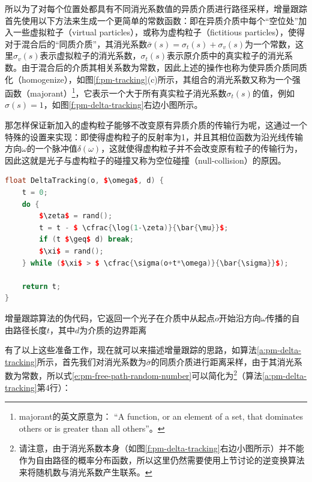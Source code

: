 所以为了对每个位置处都具有不同消光系数值的异质介质进行路径采样，增量跟踪首先使用以下方法来生成一个更简单的常数函数：即在异质介质中每个“空位处”加入一些虚拟粒子（virtual particles），或称为虚构粒子（fictitious particles），使得对于混合后的“同质介质”，其消光系数$\bar{\sigma}(s)=\sigma_t(s)+\sigma_v(s)$为一个常数，这里$\sigma_v(s)$表示虚拟粒子的消光系数，$\sigma_t(s)$表示原介质中的真实粒子的消光系数。由于混合后的介质其相关系数为常数，因此上述的操作也称为使异质介质同质化（homogenize），如图\ref{f:pm-tracking}(c)所示，其组合的消光系数又称为一个强函数（majorant）\footnote{majorant的英文原意为： “A function, or an element of a set, that dominates others or is greater than all others”。}，它表示一个大于所有真实粒子消光系数$\sigma_t(s)$的值，例如$\sigma(s)=1$\cite{a:ProgressivePhotonBeams}，如图\ref{f:pm-delta-tracking}右边小图所示。

那怎样保证新加入的虚构粒子能够不改变原有异质介质的传输行为呢，这通过一个特殊的设置来实现：即使得虚构粒子的反射率为1，并且其相位函数为沿光线传输方向$\omega$的一个脉冲值$\delta(\omega)$，这就使得虚构粒子并不会改变原有粒子的传输行为，因此这就是光子与虚构粒子的碰撞又称为空位碰撞（null-collision）的原因。

\begin{algorithm}
\begin{lstlisting}[language=C++, mathescape]
float DeltaTracking(o, $\omega$, d) {
	t = 0;
	do {
		$\zeta$ = rand();
		t = t - $ \cfrac{\log(1-\zeta)}{\bar{\mu}}$;
		if (t $\geq$ d) break;
		$\xi$ = rand();
	} while ($\xi$ > $ \cfrac{\sigma(o+t*\omega)}{\bar{\sigma}}$);
	
	return t;
}
\end{lstlisting}
\caption{增量跟踪算法的伪代码，它返回一个光子在介质中从起点$o$开始沿方向$\omega$传播的自由路径长度$t$，其中$d$为介质的边界距离}
\label{a:pm-delta-tracking}
\end{algorithm}

有了以上这些准备工作，现在就可以来描述增量跟踪的思路，如算法\ref{a:pm-delta-tracking}所示，首先我们对消光系数为$\bar{\sigma}$的同质介质进行距离采样，由于其消光系数为常数，所以式\ref{e:pm-free-path-random-number}可以简化为\footnote{请注意，由于消光系数本身（如图\ref{f:pm-delta-tracking}右边小图所示）并不能作为自由路径的概率分布函数，所以这里仍然需要使用上节讨论的逆变换算法来将随机数与消光系数产生联系。}（算法\ref{a:pm-delta-tracking}第4行）：

